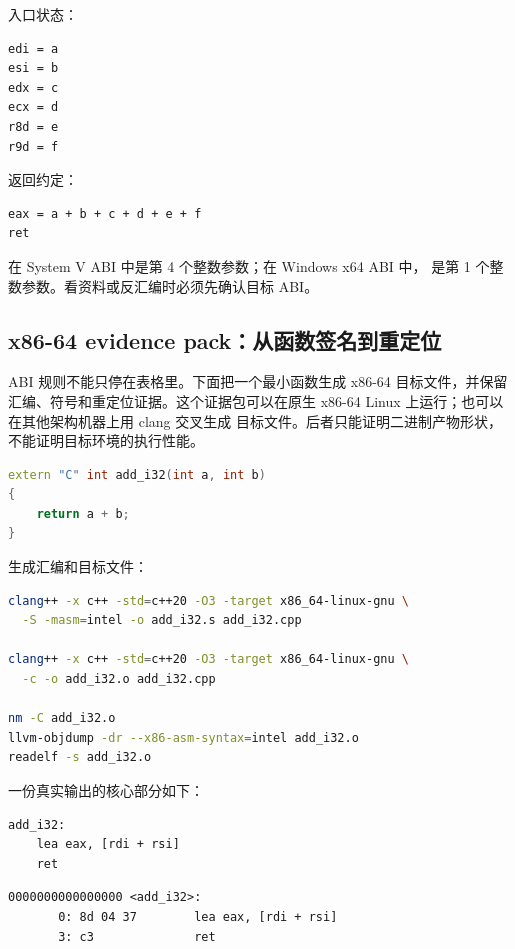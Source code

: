 入口状态：

\begin{lstlisting}
edi = a
esi = b
edx = c
ecx = d
r8d = e
r9d = f
\end{lstlisting}

返回约定：

\begin{lstlisting}
eax = a + b + c + d + e + f
ret
\end{lstlisting}

\begin{warningbox}
 在 System V ABI 中是第 4 个整数参数；在 Windows x64 ABI 中， 是第 1 个整数参数。看资料或反汇编时必须先确认目标 ABI。
\end{warningbox}

\subsection{x86-64 evidence pack：从函数签名到重定位}

ABI 规则不能只停在表格里。下面把一个最小函数生成 x86-64 目标文件，并保留汇编、符号和重定位证据。这个证据包可以在原生 x86-64 Linux 上运行；也可以在其他架构机器上用 clang 交叉生成  目标文件。后者只能证明二进制产物形状，不能证明目标环境的执行性能。

\begin{lstlisting}[language=C++,caption={被测函数：add\_i32}]
extern "C" int add_i32(int a, int b)
{
    return a + b;
}
\end{lstlisting}

生成汇编和目标文件：

\begin{lstlisting}[language=bash,caption={生成 x86-64 汇编和目标文件}]
clang++ -x c++ -std=c++20 -O3 -target x86_64-linux-gnu \
  -S -masm=intel -o add_i32.s add_i32.cpp

clang++ -x c++ -std=c++20 -O3 -target x86_64-linux-gnu \
  -c -o add_i32.o add_i32.cpp

nm -C add_i32.o
llvm-objdump -dr --x86-asm-syntax=intel add_i32.o
readelf -s add_i32.o
\end{lstlisting}

一份真实输出的核心部分如下：

\begin{lstlisting}[numbers=none,caption={add\_i32 的 x86-64 优化汇编}]
add_i32:
    lea eax, [rdi + rsi]
    ret
\end{lstlisting}

\begin{lstlisting}[numbers=none,caption={objdump 看到的机器码和符号}]
0000000000000000 <add_i32>:
       0: 8d 04 37        lea eax, [rdi + rsi]
       3: c3              ret
\end{lstlisting}

